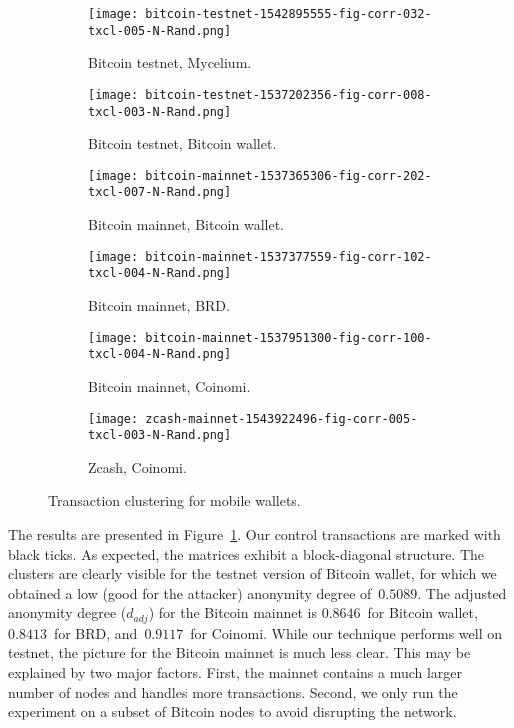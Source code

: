 \begin{figure}
	\centering
	\begin{subfigure}{.5\textwidth}
		\centering
		\texttt{[image: bitcoin-testnet-1542895555-fig-corr-032-txcl-005-N-Rand.png]}
		\caption{Bitcoin testnet, Mycelium.}
	\end{subfigure}%
	\begin{subfigure}{.5\textwidth}
		\centering
		\texttt{[image: bitcoin-testnet-1537202356-fig-corr-008-txcl-003-N-Rand.png]}
		\caption{Bitcoin testnet, Bitcoin wallet.}
	\end{subfigure}
	\begin{subfigure}{.5\textwidth}
		\centering
		\texttt{[image: bitcoin-mainnet-1537365306-fig-corr-202-txcl-007-N-Rand.png]}
		\caption{Bitcoin mainnet, Bitcoin wallet.}
	\end{subfigure}%
	\begin{subfigure}{.5\textwidth}
		\centering
		\texttt{[image: bitcoin-mainnet-1537377559-fig-corr-102-txcl-004-N-Rand.png]}
		\caption{Bitcoin mainnet, BRD.}
	\end{subfigure}
	\begin{subfigure}{.5\textwidth}
		\centering
		\texttt{[image: bitcoin-mainnet-1537951300-fig-corr-100-txcl-004-N-Rand.png]}
		\caption{Bitcoin mainnet, Coinomi.}
	\end{subfigure}%
	\begin{subfigure}{.5\textwidth}
		\centering
		\texttt{[image: zcash-mainnet-1543922496-fig-corr-005-txcl-003-N-Rand.png]}
		\caption{Zcash, Coinomi.}
	\end{subfigure}
	\caption{Transaction clustering for mobile wallets.}
	\label{fig:clustering-all}
\end{figure}

The results are presented in Figure~\ref{fig:clustering-all}.
Our control transactions are marked with black ticks.
As expected, the matrices exhibit a block-diagonal structure.
The clusters are clearly visible for the testnet version of Bitcoin wallet, for which we obtained a low (good for the attacker) anonymity degree of~$0.5089$.
The adjusted anonymity degree ($d_{adj}$) for the Bitcoin mainnet is $0.8646$~for Bitcoin wallet, $0.8413$~for BRD, and~$0.9117$~for Coinomi.
While our technique performs well on testnet, the picture for the Bitcoin mainnet is much less clear.
This may be explained by two major factors.
First, the mainnet contains a much larger number of nodes and handles more transactions.
Second, we only run the experiment on a subset of Bitcoin nodes to avoid disrupting the network.


